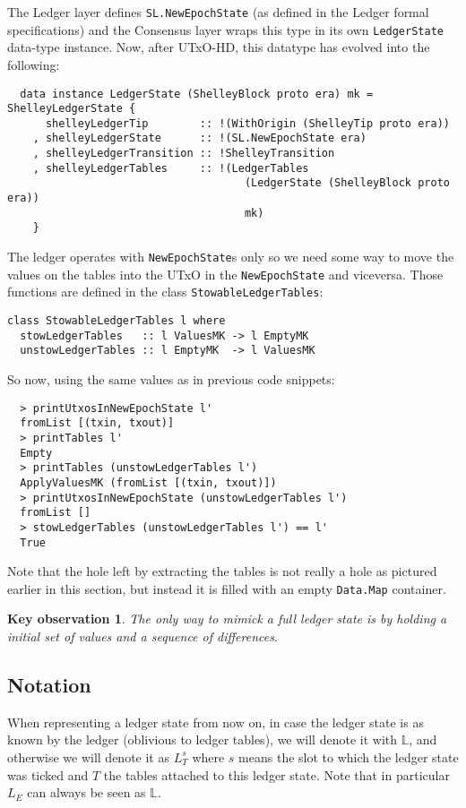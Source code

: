 \documentclass[11pt,a4paper]{article}
\theoremstyle{definition}
\newtheorem{observation}{Key observation}
\begin{document}
The Ledger layer defines \texttt{SL.NewEpochState} (as defined in the Ledger
formal specifications) and the Consensus layer wraps this type in its own
\texttt{LedgerState} data-type instance. Now, after UTxO-HD, this datatype has evolved into the following:

\begin{lstlisting}
  data instance LedgerState (ShelleyBlock proto era) mk = ShelleyLedgerState {
      shelleyLedgerTip        :: !(WithOrigin (ShelleyTip proto era))
    , shelleyLedgerState      :: !(SL.NewEpochState era)
    , shelleyLedgerTransition :: !ShelleyTransition
    , shelleyLedgerTables     :: !(LedgerTables
                                     (LedgerState (ShelleyBlock proto era))
                                     mk)
    }
\end{lstlisting}

The ledger operates with \texttt{NewEpochState}s only so we need some way to move the values on the tables into the UTxO in the \texttt{NewEpochState} and viceversa. Those functions are defined in the class \texttt{StowableLedgerTables}:

\begin{lstlisting}
class StowableLedgerTables l where
  stowLedgerTables   :: l ValuesMK -> l EmptyMK
  unstowLedgerTables :: l EmptyMK  -> l ValuesMK
\end{lstlisting}

So now, using the same values as in previous code snippets:
\begin{lstlisting}
  > printUtxosInNewEpochState l'
  fromList [(txin, txout)]
  > printTables l'
  Empty
  > printTables (unstowLedgerTables l')
  ApplyValuesMK (fromList [(txin, txout)])
  > printUtxosInNewEpochState (unstowLedgerTables l')
  fromList []
  > stowLedgerTables (unstowLedgerTables l') == l'
  True
\end{lstlisting}

Note that the hole left by extracting the tables is not really a hole as
pictured earlier in this section, but instead it is filled with an empty
\texttt{Data.Map} container.


\begin{observation}
  \label{ko1}
  \emph{The only way to mimick a full ledger state is by holding a initial set
    of values and a sequence of differences}.
\end{observation}

\subsection{Notation}
When representing a ledger state from now on, in case the ledger state is as
known by the ledger (oblivious to ledger tables), we will denote it with
$\mathbb{L}$, and otherwise we will denote it as $L^{s}_{T}$ where $s$ means the
slot to which the ledger state was ticked and $T$ the tables attached to this
ledger state. Note that in particular $L_{E}$ can always be seen as $\mathbb{L}$.
\end{document}
